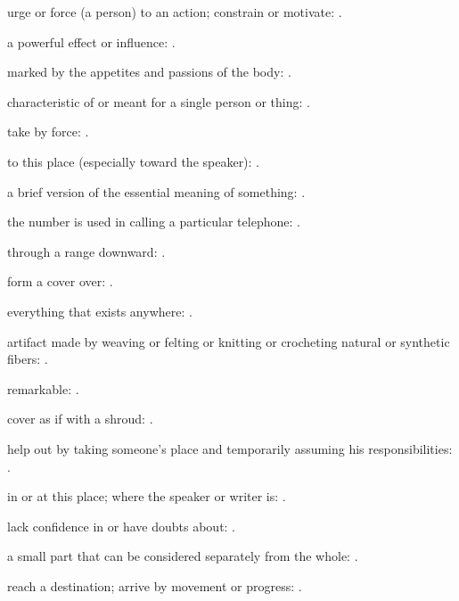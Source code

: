   urge or force (a person) to an action; constrain or motivate:   .

  a powerful effect or influence: .

  marked by the appetites and passions of the body:   .

  characteristic of or meant for a single person or thing:   .

  take by force:   .

  to this place (especially toward the speaker):   .

  a brief version of the essential meaning of something: .

  the number is used in calling a particular telephone:   .

  through a range downward: .

  form a cover over:   .

  everything that exists anywhere:   .

  artifact made by weaving or felting or knitting or crocheting natural or synthetic fibers:   .

  remarkable: .

  cover as if with a shroud:   .

  help out by taking someone's place and temporarily assuming his responsibilities: .

  in or at this place; where the speaker or writer is: .

  lack confidence in or have doubts about: .

  a small part that can be considered separately from the whole:   .

  reach a destination; arrive by movement or progress:   .

